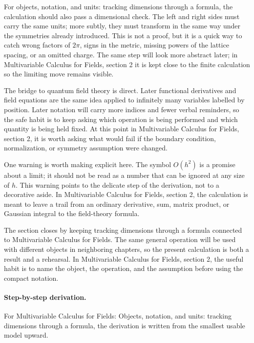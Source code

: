 For objects, notation, and units: tracking dimensions through a formula, the calculation should also pass a dimensional check.  The left and right sides must carry the same units; more subtly, they must transform in the same way under the symmetries already introduced.  This is not a proof, but it is a quick way to catch wrong factors of \(2\pi\), signs in the metric, missing powers of the lattice spacing, or an omitted charge.  The same step will look more abstract later; in Multivariable Calculus for Fields, section 2 it is kept close to the finite calculation so the limiting move remains visible.

The bridge to quantum field theory is direct.  Later functional derivatives and field equations are the same idea applied to infinitely many variables labelled by position.  Later notation will carry more indices and fewer verbal reminders, so the safe habit is to keep asking which operation is being performed and which quantity is being held fixed.  At this point in Multivariable Calculus for Fields, section 2, it is worth asking what would fail if the boundary condition, normalization, or symmetry assumption were changed.

One warning is worth making explicit here.  The symbol \(O(h^2)\) is a promise about a limit; it should not be read as a number that can be ignored at any size of \(h\).  This warning points to the delicate step of the derivation, not to a decorative aside.  In Multivariable Calculus for Fields, section 2, the calculation is meant to leave a trail from an ordinary derivative, sum, matrix product, or Gaussian integral to the field-theory formula.

The section closes by keeping tracking dimensions through a formula connected to Multivariable Calculus for Fields.  The same general operation will be used with different objects in neighboring chapters, so the present calculation is both a result and a rehearsal.  In Multivariable Calculus for Fields, section 2, the useful habit is to name the object, the operation, and the assumption before using the compact notation.



\paragraph{Step-by-step derivation.}

For Multivariable Calculus for Fields: Objects, notation, and units: tracking dimensions through a formula, the derivation is written from the smallest usable model upward.

